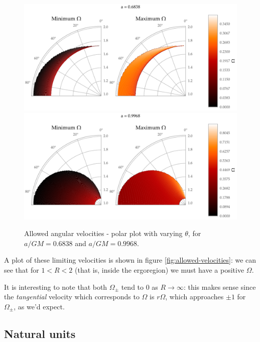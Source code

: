 \documentclass[main.tex]{subfiles}
\begin{document}
\begin{figure}[ht]
  \centering
  \includegraphics[width=\textwidth]{figures/refined_limiting_angle_a_0_6838.pdf}
  \includegraphics[width=\textwidth]{figures/refined_limiting_angle_a_0_9968.pdf}
  \caption{Allowed angular velocities - polar plot with varying \(\theta \), for \(a/GM = 0.6838\) and \(a/GM = 0.9968\).}
  \label{fig:allowed-velocities-polar}
\end{figure}

A plot of these limiting velocities is shown in figure \ref{fig:allowed-velocities}: we can see that for \(1<R<2\) (that is, inside the ergoregion) we must have a positive \(\Omega \).

It is interesting to note that both \(\Omega_{\pm}\) tend to 0 as \(R \rightarrow \infty \): this makes sense since the \emph{tangential} velocity which corresponds to \(\Omega \) is \(r \Omega \), which approaches \(\pm 1\) for \(\Omega_{\pm}\), as we'd expect. 

\subsection{Natural units}
\end{document}
